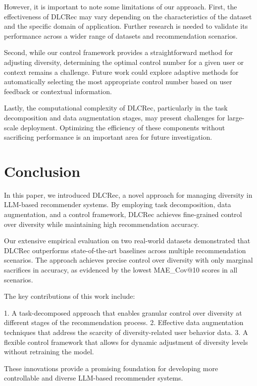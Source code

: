 \documentclass[12pt,letterpaper]{article}
\begin{document}
However, it is important to note some limitations of our approach. First, the effectiveness of DLCRec may vary depending on the characteristics of the dataset and the specific domain of application. Further research is needed to validate its performance across a wider range of datasets and recommendation scenarios.

Second, while our control framework provides a straightforward method for adjusting diversity, determining the optimal control number for a given user or context remains a challenge. Future work could explore adaptive methods for automatically selecting the most appropriate control number based on user feedback or contextual information.

Lastly, the computational complexity of DLCRec, particularly in the task decomposition and data augmentation stages, may present challenges for large-scale deployment. Optimizing the efficiency of these components without sacrificing performance is an important area for future investigation.

\section{Conclusion}

In this paper, we introduced DLCRec, a novel approach for managing diversity in LLM-based recommender systems. By employing task decomposition, data augmentation, and a control framework, DLCRec achieves fine-grained control over diversity while maintaining high recommendation accuracy.

Our extensive empirical evaluation on two real-world datasets demonstrated that DLCRec outperforms state-of-the-art baselines across multiple recommendation scenarios. The approach achieves precise control over diversity with only marginal sacrifices in accuracy, as evidenced by the lowest MAE_Cov@10 scores in all scenarios.

The key contributions of this work include:

1. A task-decomposed approach that enables granular control over diversity at different stages of the recommendation process.
2. Effective data augmentation techniques that address the scarcity of diversity-related user behavior data.
3. A flexible control framework that allows for dynamic adjustment of diversity levels without retraining the model.

These innovations provide a promising foundation for developing more controllable and diverse LLM-based recommender systems.
\end{document}
